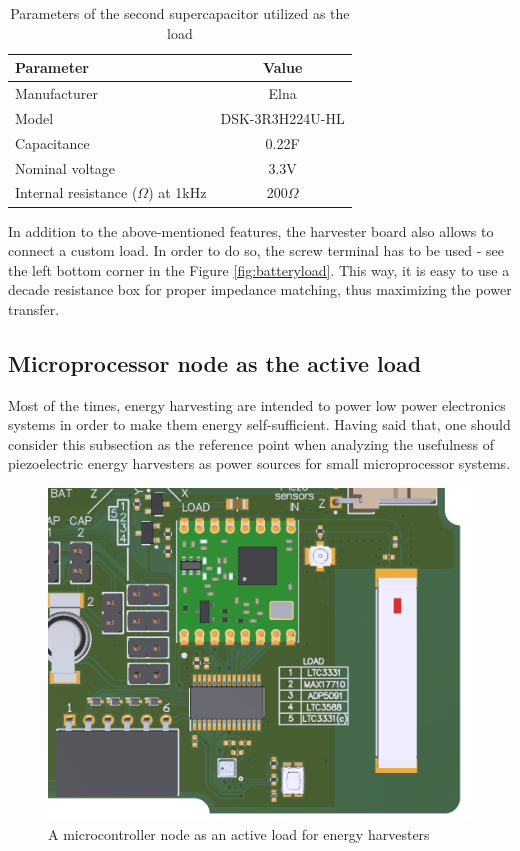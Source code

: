 \documentclass[12pt,a4paper]{article}
\begin{document}
\begin{table}[ht!]
\begin{tabular}{|l|c|}
\hline
\textbf{Parameter}              & \textbf{Value} \\ \hline
Manufacturer & Elna          \\ \hline
Model                 & DSK-3R3H224U-HL\\ \hline
Capacitance                & 0.22F         \\ \hline
Nominal voltage     & 3.3V           \\ \hline
Internal resistance ($\Omega$) at 1kHz     & 200$\Omega$ \\ \hline
\end{tabular}
\caption{Parameters of the second supercapacitor utilized as the load \cite{supercap1params} }
\label{tab:supercap2}
\end{table}
\par

In addition to the above-mentioned features, the harvester board also allows to connect a custom load. In order to do so, the screw terminal has to be used - see the left bottom corner in the Figure \ref{fig:batteryload}. This way, it is easy to use a decade resistance box for proper impedance matching, thus maximizing the power transfer.

\subsection{Microprocessor node as the active load}
Most of the times, energy harvesting are intended to power low power electronics systems in order to make them energy self-sufficient. Having said that, one should consider this subsection as the reference point when analyzing the usefulness of piezoelectric energy harvesters as power sources for small microprocessor systems. 
\begin{figure}[ht!]
\includegraphics[scale=0.75]{activeload.png}
\caption{A microcontroller node as an active load for energy harvesters}
\label{fig:activeload}
\end{figure}
\end{document}
